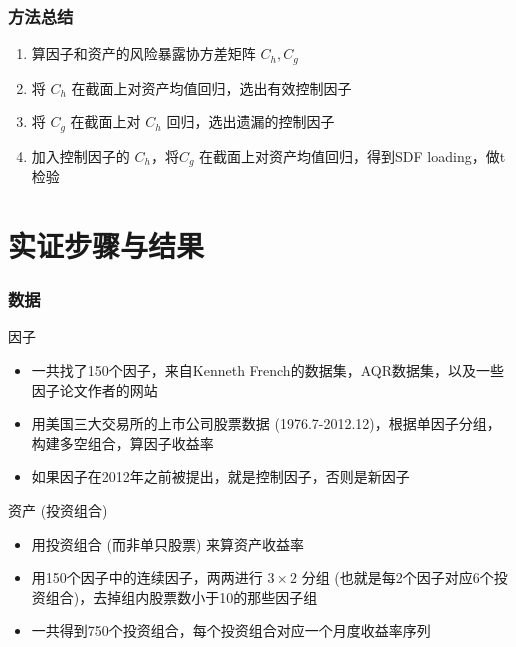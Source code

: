 \documentclass[
  UTF8,
  xcolor={dvipsnames,rgb},
  hyperref={colorlinks, citecolor=orange, linkcolor=black},
  aspectratio=169
  ]{beamer}
\begin{document}
\begin{frame}
    \frametitle{方法总结}

    \begin{enumerate}
        \item 算因子和资产的风险暴露协方差矩阵 \(C_h,C_g\)
        \item 将 \(C_h\) 在截面上对资产均值回归，选出有效控制因子
        \item 将 \(C_g\) 在截面上对 \(C_h\) 回归，选出遗漏的控制因子
        \item 加入控制因子的 \(C_h\)，将\(C_g\) 在截面上对资产均值回归，得到SDF loading，做t检验
    \end{enumerate}
\end{frame}

\section{实证步骤与结果}

\begin{frame}
    \frametitle{数据}
    
    \begin{wideitemize}
        \item 因子 \begin{itemize}
            \item 一共找了150个因子，来自Kenneth French的数据集，AQR数据集，以及一些因子论文作者的网站
            \item 用美国三大交易所的上市公司股票数据 (1976.7-2012.12)，根据单因子分组，构建多空组合，算因子收益率
            \item 如果因子在2012年之前被提出，就是控制因子，否则是新因子
        \end{itemize}
        \item 资产 (投资组合) \begin{itemize}
            \item 用投资组合 (而非单只股票) 来算资产收益率
            \item 用150个因子中的连续因子，两两进行 \(3 \times 2\) 分组 (也就是每2个因子对应6个投资组合)，去掉组内股票数小于10的那些因子组
            \item 一共得到750个投资组合，每个投资组合对应一个月度收益率序列
        \end{itemize}
    \end{wideitemize}
\end{frame}
\end{document}
